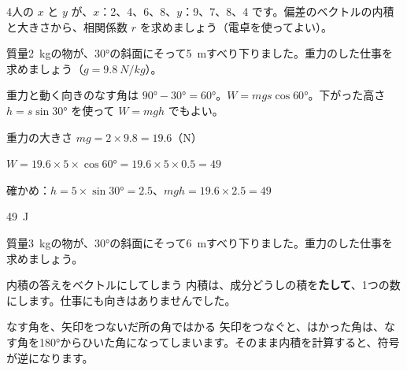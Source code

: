 \begin{jibun}
4人の $x$ と $y$ が、$x$：2、4、6、8、$y$：9、7、8、4 です。偏差のベクトルの内積と大きさから、相関係数 $r$ を求めましょう（電卓を使ってよい）。
\end{jibun}

\begin{reidai}[斜面で重力のする仕事]
質量\qty{2}{kg}の物が、30°の斜面にそって\qty{5}{m}すべり下りました。重力のした仕事を求めましょう（$g=\qty{9.8}{N/kg}$）。\par
\kangaekata 重力と動く向きのなす角は $90°-30°=60°$。$W=mgs\cos60°$。下がった高さ $h=s\sin30°$ を使って $W=mgh$ でもよい。\par
\shiki 重力の大きさ $mg=2\times9.8=19.6$（N）\par
\hspace*{2.6\zw}$W=19.6\times5\times\cos60°=19.6\times5\times0.5=49$\par
\hspace*{2.6\zw}確かめ：$h=5\times\sin30°=2.5$、$mgh=19.6\times2.5=49$\par
\kotae \qty{49}{J}
\end{reidai}

\begin{jibun}
質量\qty{3}{kg}の物が、30°の斜面にそって\qty{6}{m}すべり下りました。重力のした仕事を求めましょう。
\end{jibun}


\begin{tsumazuki}{内積の答えをベクトルにしてしまう}
内積は、成分どうしの積を\textbf{たして}、1つの数にします。仕事にも向きはありませんでした。
\end{tsumazuki}

\begin{tsumazuki}{なす角を、矢印をつないだ所の角ではかる}
矢印をつなぐと、はかった角は、なす角を180°からひいた角になってしまいます。そのまま内積を計算すると、符号が逆になります。
\end{tsumazuki}

